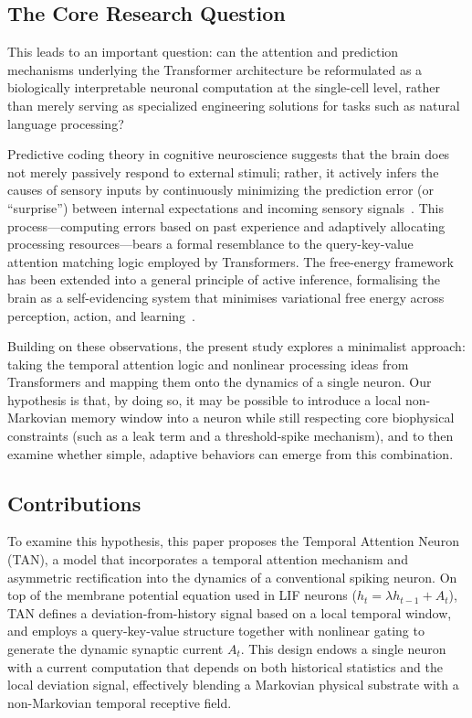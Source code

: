 \subsection{The Core Research Question}

This leads to an important question: can the attention and prediction mechanisms underlying the Transformer architecture be reformulated as a biologically interpretable neuronal computation at the single-cell level, rather than merely serving as specialized engineering solutions for tasks such as natural language processing?

Predictive coding theory in cognitive neuroscience suggests that the brain does not merely passively respond to external stimuli; rather, it actively infers the causes of sensory inputs by continuously minimizing the prediction error (or ``surprise'') between internal expectations and incoming sensory signals~\cite{friston2010,keller2018,rao1999,friston2017}. This process---computing errors based on past experience and adaptively allocating processing resources---bears a formal resemblance to the query-key-value attention matching logic employed by Transformers. The free-energy framework has been extended into a general principle of active inference, formalising the brain as a self-evidencing system that minimises variational free energy across perception, action, and learning~\cite{friston2017}.

Building on these observations, the present study explores a minimalist approach: taking the temporal attention logic and nonlinear processing ideas from Transformers and mapping them onto the dynamics of a single neuron. Our hypothesis is that, by doing so, it may be possible to introduce a local non-Markovian memory window into a neuron while still respecting core biophysical constraints (such as a leak term and a threshold-spike mechanism), and to then examine whether simple, adaptive behaviors can emerge from this combination.

\subsection{Contributions}

To examine this hypothesis, this paper proposes the Temporal Attention Neuron (TAN), a model that incorporates a temporal attention mechanism and asymmetric rectification into the dynamics of a conventional spiking neuron. On top of the membrane potential equation used in LIF neurons ($h_t = \lambda h_{t-1} + A_t$), TAN defines a deviation-from-history signal based on a local temporal window, and employs a query-key-value structure together with nonlinear gating to generate the dynamic synaptic current $A_t$. This design endows a single neuron with a current computation that depends on both historical statistics and the local deviation signal, effectively blending a Markovian physical substrate with a non-Markovian temporal receptive field.

